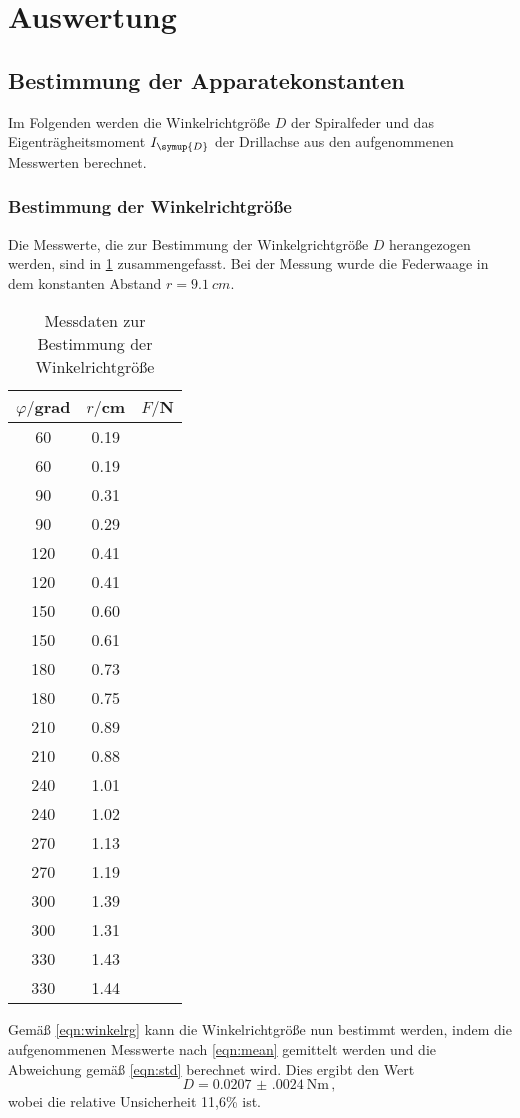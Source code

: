 \section{Auswertung}
\label{sec:Auswertung}
\subsection{Bestimmung der Apparatekonstanten}
Im Folgenden werden die Winkelrichtgröße $D$ der Spiralfeder und das
Eigenträgheitsmoment $I_{\symup{D}}$ der Drillachse aus den aufgenommenen
Messwerten berechnet.
\subsubsection{Bestimmung der Winkelrichtgröße}
Die Messwerte, die zur Bestimmung der Winkelgrichtgröße $D$ herangezogen werden,
sind in \ref{tab:winkelrichtgroesse} zusammengefasst. Bei der Messung wurde die
Federwaage in dem konstanten Abstand $r=\SI{9.1}{cm}$.
\begin{table}
\centering
\caption{Messdaten zur Bestimmung der Winkelrichtgröße}
\label{tab:winkelrichtgroesse}
\begin{tabular}{c c c}
\toprule
$\varphi/$grad & $r/$cm & $F/$N \\
\midrule
 60	& 0.19 \\
 60	& 0.19 \\
 90	& 0.31 \\
 90	& 0.29 \\
120 &	0.41 \\
120 &	0.41 \\
150 &	0.60 \\
150 &	0.61 \\
180 &	0.73 \\
180 &	0.75 \\
210 &	0.89 \\
210 &	0.88 \\
240 &	1.01 \\
240 &	1.02 \\
270 &	1.13 \\
270 &	1.19 \\
300 &	1.39 \\
300 &	1.31 \\
330 &	1.43 \\
330 &	1.44 \\
\bottomrule
\end{tabular}
\end{table}
Gemäß \eqref{eqn:winkelrg} kann die Winkelrichtgröße nun bestimmt werden, indem
die aufgenommenen Messwerte nach \eqref{eqn:mean} gemittelt werden und die
Abweichung gemäß \eqref{eqn:std} berechnet wird. Dies ergibt den Wert
\begin{equation}
  D = \SI{0.0207(0024)}{\newton\meter}\,,
\end{equation}
wobei die relative Unsicherheit 11,6\% ist.
